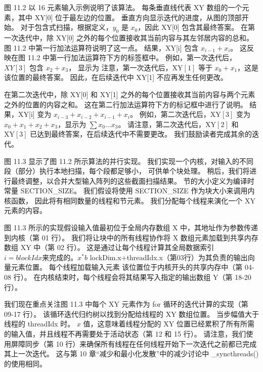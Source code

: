 图 11.2 以 16 元素输入示例说明了该算法。 每条垂直线代表 XY 数组的一个元素，其中 XY[0] 位于最左边的位置。 
垂直方向显示迭代的进度，从图的顶部开始。 对于包含式扫描，根据定义，$y_{0}$ 是 $x_{0}$，因此 XY[0] 包含其最终答案。 
在第一次迭代中，除 XY[0] 之外的每个位置接收其当前内容与其左邻居内容的总和。 图 11.2 中第一行加法运算符说明了这一点。 
结果，XY[i] 包含 $x_{i-1}+x_{i}$。 这反映在图 11.2 中第一行加法运算符下方的标签框中。 
例如，第一次迭代后，$X Y[3]$ 包含 $x_{2}+x_{3}$，
显示为 注意，第一次迭代后，$\mathrm{XY}[1]$ 等于 $ x_{0}+x_{1}$，这是该位置的最终答案。 
因此，在后续迭代中 XY[1] 不应再发生任何更改。

在第二次迭代中，除 XY[0] 和 XY[1] 之外的每个位置接收其当前内容与两个元素之外的位置的内容之和。 
这在第二行加法运算符下方的标记框中进行了说明。 结果，XY[i] 变为 $x_{i-3}+x_{i-2}+x_{i-1}+x_{i}$。 
例如，第二次迭代后，$\mathrm{XY}[3]$ 变为 $x_{0}+x_{1}+x_{2}+x_{3}$，显示为 $\sum x_{0} \ldots x_{3}$。 
请注意，第二次迭代后，$\mathrm{XY}[2]$ 和 $\mathrm{XY}[3]$ 已达到最终答案，在后续迭代中不需要更改。 
我们鼓励读者完成其余的迭代。

图 11.3 显示了图 11.2 所示算法的并行实现。 我们实现一个内核，对输入的不同段（部分）执行本地扫描，每个段都足够小，
可供单个块处理。 稍后，我们将进行最终调整，以合并大型输入阵列的这些截面扫描结果。 
节的大小定义为编译时常量 SECTION\_SIZE。 我们假设将使用 SECTION\_SIZE 作为块大小来调用内核函数，
因此将有相同数量的线程和节元素。 我们分配每个线程来演化一个 $\mathrm{XY}$ 元素的内容。

图 11.3 所示的实现假设输入值最初位于全局内存数组 $\mathrm{X}$ 中，其地址作为参数传递到内核（第 01 行）。 
我们将让块中的所有线程协作将 $\mathrm{X}$ 数组元素加载到共享内存数组 XY 中（第 02 行）。 
这是通过让每个线程计算其全局数据索引 $i=b l o c k I d x 来完成的。 x^{*} b$ lockDim.x+threadIdx.x（第03行）为其负责的输出向量元素位置。 每个线程加载输入元素
该位置位于内核开头的共享内存中（第 04-08 行）。 
在内核结束时，每个线程会将其结果写入指定的输出数组 Y（第 18-20 行）。

我们现在重点关注图 11.3 中每个 $\mathrm{XY}$ 元素作为 for 循环的迭代计算的实现（第 09-17 行）。 
该循环迭代归约树以找到分配给线程的 $\mathrm{XY}$ 数组位置。 当步幅值大于线程的 threadIdx 时。 
$x$ 值，这意味着线程分配的 XY 位置已经累积了所有所需的输入值，并且线程不再需要处于活动状态（第 12 和 15 行）。 
请注意，我们使用屏障同步（第 10 行）来确保所有线程在任何线程开始下一次迭代之前都已完成其上一次迭代。 
这与第 10 章“减少和最小化发散”中的减少讨论中 \_syncthreads() 的使用相同。

